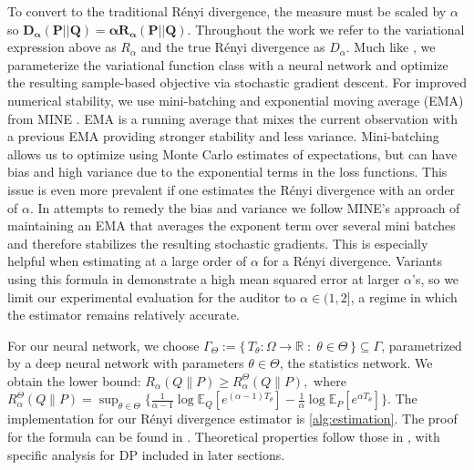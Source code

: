 \documentclass{article}
\theoremstyle{plain}
\theoremstyle{definition}
\theoremstyle{remark}
\begin{document}
To convert to the traditional R\'enyi divergence, the measure must be scaled by $\alpha$ so $\boldsymbol{D_\alpha(P||Q) = \alpha R_\alpha(P||Q)}$. Throughout the work we refer to the variational expression above as $R_\alpha$ and the true R\'enyi divergence as $D_\alpha$. Much like \cite{birrell2021variational}, we parameterize the variational function class with a neural network and optimize the resulting sample-based objective via stochastic gradient descent. For improved numerical stability, we use mini-batching and exponential moving average (EMA) from MINE \cite{belghazi2018mine}. EMA is a running average that mixes the current observation with a previous EMA providing stronger stability and less variance. Mini-batching allows us to optimize using Monte Carlo estimates of expectations, but can have bias and high variance due to the exponential terms in the loss functions. This issue is even more prevalent if one estimates the R\'enyi divergence with an order of $\alpha$. In attempts to remedy the bias and variance we follow MINE's approach of maintaining an EMA that averages the exponent term over several mini batches and therefore stabilizes the resulting stochastic gradients. This is especially helpful when estimating at a large order of $\alpha$ for a R\'enyi divergence. Variants using this formula in \cite{birrell2021variational} demonstrate a high mean squared error at larger $\alpha$'s, so we limit our experimental evaluation for the auditor to $\alpha \in (1, 2]$, a regime in which the estimator remains relatively accurate.

For our neural network, we choose $\Gamma_{\Theta} := \{\, T_{\theta} : \Omega \to \mathbb{R} \;:\; \theta \in \Theta \,\} \subseteq \Gamma$,
parametrized by a deep neural network with parameters $\theta \in \Theta$, the statistics network. We obtain the lower bound:
\(
R_\alpha(Q\|P) \ge R^\Theta_\alpha(Q\|P),
\)
where 
\(
R^\Theta_\alpha(Q\|P) =
\sup_{\theta\in\Theta}
\big\{
\frac{1}{\alpha-1}\log \mathbb{E}_{ Q}\!\left[e^{(\alpha-1)T_\theta}\right]
-
\frac{1}{\alpha}\log \mathbb{E}_{P}\!\left[e^{\alpha T_\theta}\right]
\big\}.
\)
The implementation for our R\'enyi divergence estimator is  \cref{alg:estimation}. The proof for the formula can be found in \cite[Section 6.2]{birrell2021variational}. Theoretical properties follow those in \cite{birrell2021variational, belghazi2018mine}, with specific analysis for DP included in later sections.
\end{document}
